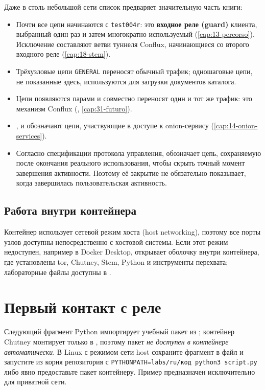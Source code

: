 Даже в столь небольшой сети список предваряет значительную часть книги:
\begin{itemize}
  \item Почти все цепи начинаются с \texttt{test004r}: это \textbf{входное реле (guard)} клиента, выбранный один раз и затем многократно используемый (\cref{cap:13-percorso}). Исключение составляют ветви туннеля Conflux, начинающиеся со второго входного реле (\cref{cap:18-stem}).
  \item Трёхузловые цепи \texttt{GENERAL} переносят обычный трафик; одношаговые цепи, не показанные здесь, используются для загрузки документов каталога.
  \item Цепи  появляются парами и совместно переносят один и тот же трафик: это механизм Conflux (, \cref{cap:31-futuro}).
  \item {},  и  обозначают цепи, участвующие в доступе к onion-сервису (\cref{cap:14-onion-services}).
  \item Согласно спецификации протокола управления,  обозначает цепь, сохраняемую после окончания реального использования, чтобы скрыть точный момент завершения активности. Поэтому её закрытие не обязательно показывает, когда завершилась пользовательская активность.
\end{itemize}

\subsection{Работа внутри контейнера}\label{sec:rp-shell}

Контейнер использует сетевой режим хоста (host networking), поэтому все порты узлов доступны непосредственно с хостовой системы. Если этот режим недоступен, например в Docker Desktop,  открывает оболочку внутри контейнера, где установлены tor, Chutney, Stem, Python и инструменты перехвата; лабораторные файлы доступны в .

\section{Первый контакт с реле}\label{sec:rp-contatto}

Следующий фрагмент Python импортирует учебный пакет  из ; контейнер Chutney монтирует только  в , поэтому пакет \emph{не доступен в контейнере автоматически}. В Linux с режимом сети host сохраните фрагмент в файл и запустите из корня репозитория с \texttt{PYTHONPATH=labs/ru/код python3 script.py} либо явно предоставьте пакет контейнеру. Пример предназначен исключительно для приватной сети.

